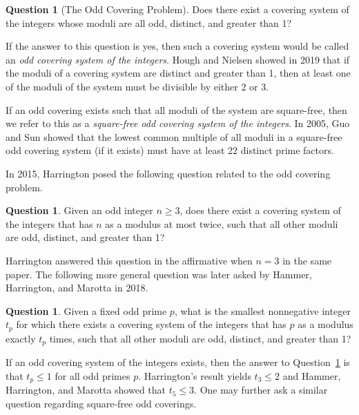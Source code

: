 \documentclass[12pt]{article}
\theoremstyle{definition}
\newtheorem{question}[theorem]{Question}
\begin{document}
\begin{question}[The Odd Covering Problem]
Does there exist a covering system of the integers whose moduli are all odd, distinct, and greater than 1?
\end{question}

If the answer to this question is yes, then such a covering system would be called an \emph{odd covering system of the integers}.  Hough and Nielsen \cite{hn} showed in 2019 that if the moduli of a covering system are distinct and greater than 1, then at least one of the moduli of the system must be divisible by either $2$ or $3$.  

If an odd covering exists such that all moduli of the system are square-free, then we refer to this as a \emph{square-free odd covering system of the integers}.  In 2005, Guo and Sun \cite{gs} showed that the lowest common multiple of all moduli in a square-free odd covering system (if it exists) must have at least 22 distinct prime factors.%

In 2015, Harrington \cite{h} posed the following question related to the odd covering problem.

\begin{question}
Given an odd integer $n\geq 3$, does there exist a covering system of the integers that has $n$ as a modulus at most twice, such that all other moduli are odd, distinct, and greater than 1?
\end{question}

Harrington answered this question in the affirmative when $n=3$ in the same paper.  The following more general question was later asked by Hammer, Harrington, and Marotta \cite{hhm} in 2018.

\begin{question}\label{question:mainquestion}
Given a fixed odd prime $p$, what is the smallest nonnegative integer $t_p$ for which there exists a covering system of the integers that has $p$ as a modulus exactly $t_p$ times, such that all other moduli are odd, distinct, and greater than 1?
\end{question}

If an odd covering system of the integers exists, then the answer to Question~\ref{question:mainquestion} is that $t_p\leq 1$ for all odd primes $p$.  Harrington's result yields $t_3\leq 2$ and Hammer, Harrington, and Marotta showed that $t_5\leq 3$.  One may further ask a similar question regarding square-free odd coverings.
\end{document}
